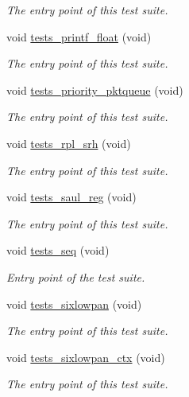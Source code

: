 \begin{DoxyCompactItemize}
\begin{DoxyCompactList}\small\item\em The entry point of this test suite. \end{DoxyCompactList}\item 
void \hyperlink{group__unittests_ga931f7ea19ee04d7b42dd1adb0f8ad87a}{tests\+\_\+printf\+\_\+float} (void)
\begin{DoxyCompactList}\small\item\em The entry point of this test suite. \end{DoxyCompactList}\item 
void \hyperlink{group__unittests_gab6133c9a0e70affe6b5a5267478e6d9d}{tests\+\_\+priority\+\_\+pktqueue} (void)
\begin{DoxyCompactList}\small\item\em The entry point of this test suite. \end{DoxyCompactList}\item 
void \hyperlink{group__unittests_ga48f41dab63963836bd0a692d9137d0a8}{tests\+\_\+rpl\+\_\+srh} (void)
\begin{DoxyCompactList}\small\item\em The entry point of this test suite. \end{DoxyCompactList}\item 
void \hyperlink{group__unittests_gaeae46a0be227b9113311165fc3b3752b}{tests\+\_\+saul\+\_\+reg} (void)
\begin{DoxyCompactList}\small\item\em The entry point of this test suite. \end{DoxyCompactList}\item 
void \hyperlink{group__unittests_gaad689d0f2a9566f1cc70188eabdfd24c}{tests\+\_\+seq} (void)
\begin{DoxyCompactList}\small\item\em Entry point of the test suite. \end{DoxyCompactList}\item 
void \hyperlink{group__unittests_gab1ea4d232c2abb95e5705f20432f3e07}{tests\+\_\+sixlowpan} (void)
\begin{DoxyCompactList}\small\item\em The entry point of this test suite. \end{DoxyCompactList}\item 
void \hyperlink{group__unittests_gaf9311b39cb1410823a35205c822900d9}{tests\+\_\+sixlowpan\+\_\+ctx} (void)
\begin{DoxyCompactList}\small\item\em The entry point of this test suite. \end{DoxyCompactList}\item 

\end{DoxyCompactItemize}
